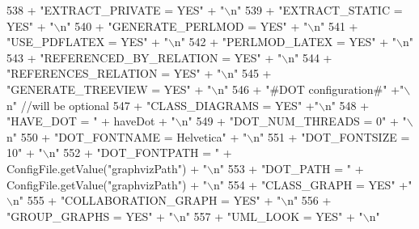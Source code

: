\begin{DoxyCode}
538                     + \textcolor{stringliteral}{"EXTRACT\_PRIVATE = YES"} + \textcolor{stringliteral}{"\(\backslash\)n"}
539                     + \textcolor{stringliteral}{"EXTRACT\_STATIC = YES"} + \textcolor{stringliteral}{"\(\backslash\)n"}
540                     + \textcolor{stringliteral}{"GENERATE\_PERLMOD = YES"} + \textcolor{stringliteral}{"\(\backslash\)n"}
541                     + \textcolor{stringliteral}{"USE\_PDFLATEX = YES"} + \textcolor{stringliteral}{"\(\backslash\)n"}
542                     + \textcolor{stringliteral}{"PERLMOD\_LATEX = YES"} + \textcolor{stringliteral}{"\(\backslash\)n"}
543                     + \textcolor{stringliteral}{"REFERENCED\_BY\_RELATION = YES"} + \textcolor{stringliteral}{"\(\backslash\)n"}
544                     + \textcolor{stringliteral}{"REFERENCES\_RELATION = YES"} + \textcolor{stringliteral}{"\(\backslash\)n"}
545                     + \textcolor{stringliteral}{"GENERATE\_TREEVIEW = YES"} + \textcolor{stringliteral}{"\(\backslash\)n"}
546                     + \textcolor{stringliteral}{"#DOT configuration#"} +\textcolor{stringliteral}{"\(\backslash\)n"}   \textcolor{comment}{//will be optional}
547                     + \textcolor{stringliteral}{"CLASS\_DIAGRAMS = YES"} +\textcolor{stringliteral}{"\(\backslash\)n"}
548                     + \textcolor{stringliteral}{"HAVE\_DOT = "} + haveDot + \textcolor{stringliteral}{"\(\backslash\)n"}
549                     + \textcolor{stringliteral}{"DOT\_NUM\_THREADS = 0"} + \textcolor{stringliteral}{"\(\backslash\)n"}
550                     + \textcolor{stringliteral}{"DOT\_FONTNAME = Helvetica"} + \textcolor{stringliteral}{"\(\backslash\)n"}
551                     + \textcolor{stringliteral}{"DOT\_FONTSIZE = 10"} + \textcolor{stringliteral}{"\(\backslash\)n"}
552                     + \textcolor{stringliteral}{"DOT\_FONTPATH = "} + ConfigFile.getValue(\textcolor{stringliteral}{"graphvizPath"}) + \textcolor{stringliteral}{"\(\backslash\)n"}
553                     + \textcolor{stringliteral}{"DOT\_PATH = "} + ConfigFile.getValue(\textcolor{stringliteral}{"graphvizPath"}) + \textcolor{stringliteral}{"\(\backslash\)n"}
554                     + \textcolor{stringliteral}{"CLASS\_GRAPH = YES"} +\textcolor{stringliteral}{"\(\backslash\)n"}
555                     + \textcolor{stringliteral}{"COLLABORATION\_GRAPH = YES"} + \textcolor{stringliteral}{"\(\backslash\)n"}
556                     + \textcolor{stringliteral}{"GROUP\_GRAPHS = YES"} + \textcolor{stringliteral}{"\(\backslash\)n"}
557                     + \textcolor{stringliteral}{"UML\_LOOK = YES"} + \textcolor{stringliteral}{"\(\backslash\)n"}

\end{DoxyCode}
